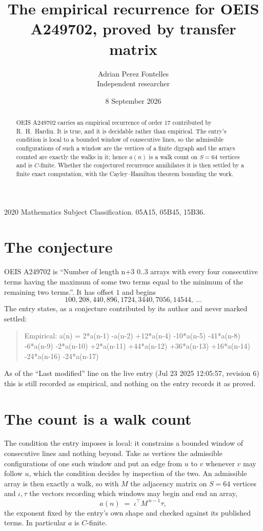 \documentclass[11pt,a4paper]{article}
\title{The empirical recurrence for OEIS A249702, proved by transfer matrix}
\author{Adrian Perez Fontelles\\ \small Independent researcher}
\date{8 September 2026}
\theoremstyle{plain}
\theoremstyle{definition}
\begin{document}
\maketitle

\begin{abstract}
OEIS A249702 carries an empirical recurrence of order $17$ contributed by R.~H.~Hardin. It is
true, and it is decidable rather than empirical. The entry's condition is local to a bounded window of consecutive lines, so
the admissible configurations of such a window are the vertices of a finite digraph and the
arrays counted are exactly the walks in it; hence $a(n)$ is a walk count on $S=64$ vertices
and is $C$-finite. Whether the conjectured recurrence annihilates it is then settled by a
finite exact computation, with the Cayley--Hamilton theorem bounding the work.
\end{abstract}

\noindent\small 2020 Mathematics Subject Classification. 05A15, 05B45, 15B36.\normalsize

\section{The conjecture}

OEIS A249702 is ``Number of length n+3 0..3 arrays with every four consecutive terms having the maximum of some two terms equal to the minimum of the remaining two terms.''. It has offset $1$ and begins
\[
100, 208, 440, 896, 1724, 3440, 7056, 14544,\ \dots
\]
The entry states, as a conjecture contributed by its author and never marked settled:
\begin{quote}
Empirical: a(n) = 2*a(n-1) -a(n-2) +12*a(n-4) -10*a(n-5) -41*a(n-8) -6*a(n-9) -2*a(n-10) +2*a(n-11) +44*a(n-12) +36*a(n-13) +16*a(n-14) -24*a(n-16) -24*a(n-17)
\end{quote}
As of the ``Last modified'' line on the live entry (Jul 23 2025 12:05:57, revision 6) this is still
recorded as empirical, and nothing on the entry records it as proved.

\section{The count is a walk count}

The condition the entry imposes is local: it constrains a bounded window of consecutive lines and nothing beyond. Take as
vertices the admissible configurations of one such window and put an edge from $u$ to $v$
whenever $v$ may follow $u$, which the condition decides by inspection of the two. An
admissible array is then exactly a walk, so with $M$ the adjacency matrix on $S=64$ vertices
and $\iota,\tau$ the vectors recording which windows may begin and end an array,
\[
a(n)\;=\;\iota^{\!\top}M^{\,n-1}\tau ,
\]
the exponent fixed by the entry's own shape and checked against its published terms. In
particular $a$ is $C$-finite.
\end{document}
